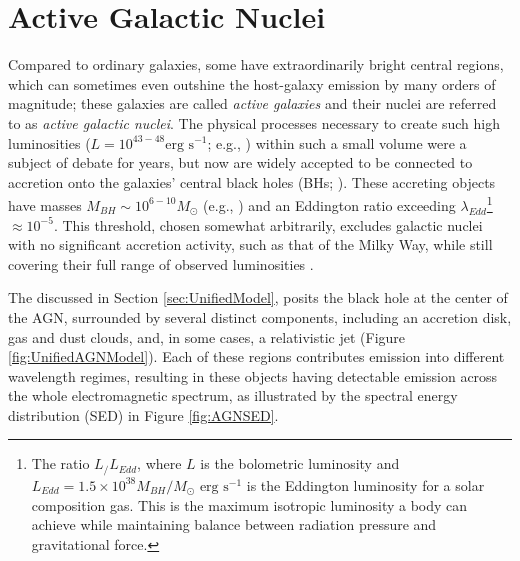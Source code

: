 \chapter{Active Galactic Nuclei}
\label{chap:agn}
Compared to ordinary galaxies, some have extraordinarily bright central regions, which can sometimes even outshine the host-galaxy emission by many orders of magnitude; these galaxies are called \textit{active galaxies} and their nuclei are referred to as \textit{active galactic nuclei}. The physical processes necessary to create such high luminosities ($L = 10^{43-48} \text{erg s}^{-1}$; e.g., \cite{Lusso2012AGNLuminosity}) within such a small volume were a subject of debate for years, but now are widely accepted to be connected to accretion onto the galaxies' central black holes (BHs; \cites{Salpeter1964AccretionTheory}{Zeldovich1964AccretionTheory}). These accreting objects have masses $M_{BH} \sim 10^{6-10} M_{\odot}$ (e.g., \cite{Peterson2004AstNach}) and an Eddington ratio exceeding $\lambda_{Edd}$\footnote{The ratio $L_/L_{Edd}$, where $L$ is the bolometric luminosity and $L_{Edd} = 1.5 \times 10^{38}M_{BH}/M_{\odot} \text{ erg s}^{-1}$ is the Eddington luminosity for a solar composition gas. This is the maximum isotropic luminosity a body can achieve while maintaining balance between radiation pressure and gravitational force.} $\approx 10^{-5}$. This threshold, chosen somewhat arbitrarily, excludes galactic nuclei with no significant accretion activity, such as that of the Milky Way, while still covering their full range of observed luminosities \parencite{Netzer2015AnnRev}. 

The  \parencites{Antonucci1993UnifiedAGN}{UrryPadovani1995UnifiedAGN} discussed in Section \ref{sec:UnifiedModel}, posits the black hole at the center of the AGN, surrounded by several distinct components, including an accretion disk, gas and dust clouds, and, in some cases, a relativistic jet (Figure \ref{fig:UnifiedAGNModel}). Each of these regions contributes emission into different wavelength regimes, resulting in these objects having detectable emission across the whole electromagnetic spectrum, as illustrated by the spectral energy distribution (SED) in Figure \ref{fig:AGNSED}. 

